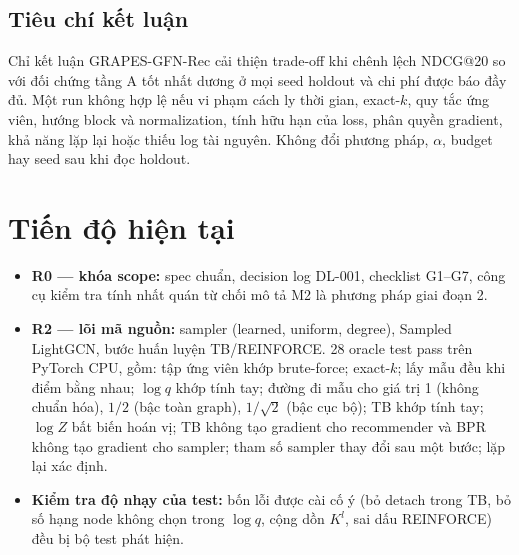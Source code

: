 \documentclass[11pt,a4paper]{article}
\begin{document}
\subsection{Tiêu chí kết luận}
Chỉ kết luận GRAPES-GFN-Rec cải thiện trade-off khi chênh lệch NDCG@20 so với đối chứng tầng A tốt nhất dương ở mọi seed holdout và chi phí được báo đầy đủ. Một run không hợp lệ nếu vi phạm cách ly thời gian, exact-$k$, quy tắc ứng viên, hướng block và normalization, tính hữu hạn của loss, phân quyền gradient, khả năng lặp lại hoặc thiếu log tài nguyên. Không đổi phương pháp, $\alpha$, budget hay seed sau khi đọc holdout.

\section{Tiến độ hiện tại}
\begin{itemize}
\item \textbf{R0 --- khóa scope:} spec chuẩn, decision log DL-001, checklist G1--G7, công cụ kiểm tra tính nhất quán từ chối mô tả M2 là phương pháp giai đoạn 2.
\item \textbf{R2 --- lõi mã nguồn:} sampler (learned, uniform, degree), Sampled LightGCN, bước huấn luyện TB/REINFORCE. 28 oracle test pass trên PyTorch CPU, gồm: tập ứng viên khớp brute-force; exact-$k$; lấy mẫu đều khi điểm bằng nhau; $\log q$ khớp tính tay; đường đi mẫu cho giá trị 1 (không chuẩn hóa), $1/2$ (bậc toàn graph), $1/\sqrt{2}$ (bậc cục bộ); TB khớp tính tay; $\log Z$ bất biến hoán vị; TB không tạo gradient cho recommender và BPR không tạo gradient cho sampler; tham số sampler thay đổi sau một bước; lặp lại xác định.
\item \textbf{Kiểm tra độ nhạy của test:} bốn lỗi được cài cố ý (bỏ detach trong TB, bỏ số hạng node không chọn trong $\log q$, cộng dồn $K^l$, sai dấu REINFORCE) đều bị bộ test phát hiện.
\end{itemize}

\end{document}

